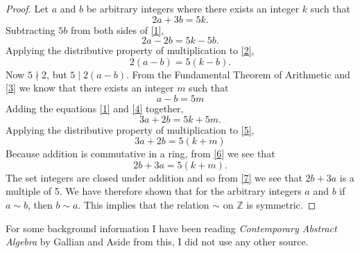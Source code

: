 \documentclass[12pt]{article}
\begin{document}
\begin{proof}
Let $a$ and $b$ be arbitrary integers where there exists an integer $k$ such that
\begin{equation}\label{1}
2a + 3b = 5k.
\end{equation}
Subtracting $5b$ from both sides of \eqref{1},
\begin{equation}\label{2}
2a - 2b = 5k - 5b.
\end{equation}
Applying the distributive property of multiplication to \eqref{2},
\begin{equation}\label{3}
2(a-b) = 5(k-b).
\end{equation}
Now $5\nmid 2$, but $5\mid 2(a-b)$. From the Fundamental Theorem of Arithmetic and \eqref{3} we know that there exists an integer $m$ such that
\begin{equation}\label{4}
a-b=5m
\end{equation}
Adding the equations \eqref{1} and \eqref{4} together,
\begin{equation}\label{5}
3a + 2b = 5k + 5m.
\end{equation}
Applying the distributive property of multiplication to \eqref{5},
\begin{equation}\label{6}
3a + 2b = 5(k+m)
\end{equation}
Because addition is commutative in a ring, from \eqref{6} we see that
\begin{equation}\label{7}
2b + 3a = 5(k+m).
\end{equation}
The set integers are closed under addition and so from \eqref{7} we see that $2b+3a$ is a multiple of 5. We have therefore shown that for the arbitrary integers $a$ and $b$ if $a\sim b$, then $b \sim a$. This implies that the relation $\sim$ on $\mathbb{Z}$ is symmetric.
\end{proof}



For some background information I have been reading {\it Contemporary Abstract Algebra} by Gallian and   Aside from this, I did not use any other source.
\end{document}
